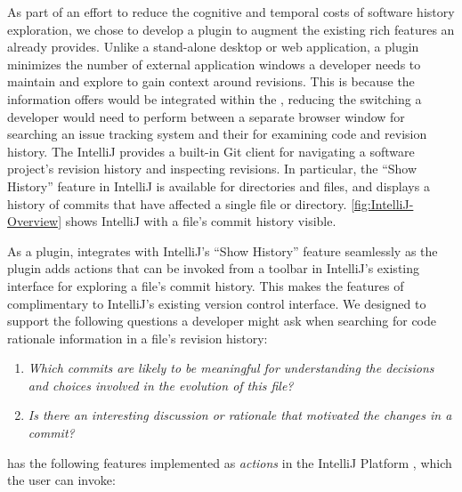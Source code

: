 As part of an effort to reduce the cognitive and temporal costs of software history exploration, we chose to develop a plugin to augment the existing rich features an  already provides.
Unlike a stand-alone desktop or web application, a plugin minimizes the number of external application windows a developer needs to maintain and explore to gain context around revisions. 
This is because the information  offers would be integrated within the , reducing the switching a developer would need to perform between a separate browser window for searching an issue tracking system and their  for examining code and revision history.
The IntelliJ  provides a built-in Git client  for navigating a software project's revision history and inspecting revisions. 
In particular, the ``Show History'' feature in IntelliJ is available for directories and files, and displays a history of commits that have affected a single file or directory.
\autoref{fig:IntelliJ-Overview} shows IntelliJ with a file's commit history visible.

As a plugin,  integrates with IntelliJ's ``Show History'' feature seamlessly as the plugin adds actions that can be invoked from a toolbar in IntelliJ's existing interface for exploring a file's commit history. 
This makes the features of  complimentary to IntelliJ's existing version control interface.
We designed  to support the following questions a developer might ask when searching for code rationale information in a file's revision history:

\begin{enumerate}[label={(\arabic*)}]
    \item \textit{Which commits are likely to be meaningful for understanding the decisions and choices involved in the evolution of this file?}
    \item \textit{Is there an interesting discussion or rationale that motivated the changes in a commit?}
\end{enumerate}

 has the following features implemented as \emph{actions} in the IntelliJ Platform , which the user can invoke:

